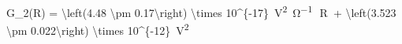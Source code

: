 G_2(R) = \SI[parse-numbers = false]{\left(4.48 \pm 0.17\right) \times 10^{-17}}{\volt^2\per\ohm}\, \cdot \,R\, + \SI[parse-numbers = false]{\left(3.523 \pm 0.022\right) \times 10^{-12}}{\volt^2}